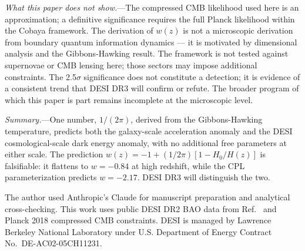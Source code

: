 \documentclass[aps,prl,twocolumn,showpacs,preprintnumbers,amsmath,amssymb,superscriptaddress]{revtex4-2}
\begin{document}
\textit{What this paper does not show.}---The compressed CMB likelihood 
used here is an approximation; a definitive significance requires the 
full Planck likelihood within the Cobaya framework. The derivation of 
$w(z)$ is not a microscopic derivation from boundary quantum information 
dynamics --- it is motivated by dimensional analysis and the 
Gibbons-Hawking result. The framework is not tested against supernovae 
or CMB lensing here; those sectors may impose additional constraints. 
The 2.5$\sigma$ significance does not constitute a detection; it is 
evidence of a consistent trend that DESI DR3 will confirm or refute. 
The broader program of which this paper is part remains incomplete at 
the microscopic level.

\textit{Summary.}---One number, $1/(2\pi)$, derived from the 
Gibbons-Hawking temperature, predicts both the galaxy-scale 
acceleration anomaly and the DESI cosmological-scale dark energy 
anomaly, with no additional free parameters at either scale. The prediction 
$w(z) = -1 + (1/2\pi)[1-H_0/H(z)]$ is falsifiable: it flattens to 
$w = -0.84$ at high redshift, while the CPL parameterization predicts 
$w = -2.17$. DESI DR3 will distinguish the two.

\begin{acknowledgments}
The author used Anthropic's Claude for manuscript preparation and analytical cross-checking. This work uses public DESI DR2 BAO data from Ref.~\cite{CobayaSampler} and Planck 2018 compressed CMB constraints. DESI is managed by Lawrence Berkeley National Laboratory under U.S. Department of Energy Contract No.\ DE-AC02-05CH11231.
\end{acknowledgments}
\end{document}
